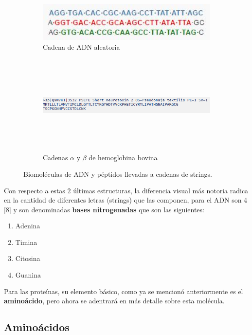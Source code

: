 \begin{figure}[H]

\begin{subfigure}{0.5\textwidth}
\includegraphics[width=1\linewidth, height=2cm]{./images/adnejemplo}
\caption{Cadena de ADN aleatoria}
\label{fig:subim4}
\end{subfigure}
\begin{subfigure}{0.4\textwidth}
\includegraphics[width=1\linewidth, height=5cm]{./images/cadena} 
\caption{Cadenas $\alpha$ y $\beta$ de hemoglobina bovina}
\label{fig:subim3}
\end{subfigure}
 
\caption{Biomoléculas de ADN y péptidos llevadas a cadenas de strings.}
\label{fig:image2}
\end{figure}

Con respecto a estas 2 últimas estructuras, la diferencia visual más notoria radica en la cantidad de diferentes letras (strings) que las componen, para el ADN son 4 [8] y son denominadas \textbf{bases nitrogenadas} que son las siguientes:

\begin{enumerate}
\item Adenina
\item Timina
\item Citosina
\item Guanina
\end{enumerate}

Para las proteínas, su elemento básico, como ya se mencionó anteriormente es el \textbf{aminoácido}, pero ahora se adentrará en más detalle sobre esta molécula.

\subsection{Aminoácidos}

